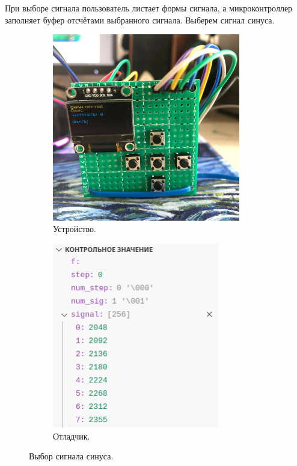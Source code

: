 	При выборе сигнала пользователь листает формы сигнала, а микроконтроллер заполняет буфер отсчётами выбранного сигнала. Выберем сигнал синуса.
	\begin{figure}[H]\captionsetup[subfigure]{font=normalsize}
     \begin{subfigure}[H]{0.5\textwidth}
         \centering
         \includegraphics[width=0.9\textwidth]{../image/test1_u_s.jpg}
         \caption{Устройство.}
     \end{subfigure}
     \hfill
     \begin{subfigure}[H]{0.5\textwidth}
         \centering
         \includegraphics[width=0.8\textwidth]{../image/test1_o_s.png}
         \caption{Отладчик.}
     \end{subfigure}
        \caption{Выбор сигнала синуса.}
	\end{figure}
	
